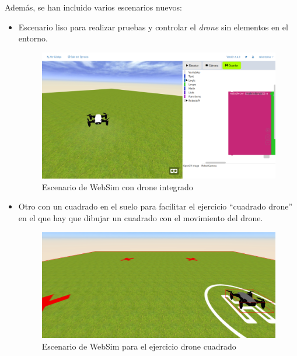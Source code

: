 Además, se han incluido varios escenarios nuevos:
\begin{itemize}
    \item Escenario liso para realizar pruebas y controlar el \textit{drone} sin elementos en el entorno. 
    
    \begin{figure}[H]
    \centering
    \includegraphics[scale=0.3]{img/websimDrone.png}
    \caption{Escenario de WebSim con drone integrado} \label{fig:escenarioDrone}
    \end{figure}
    
    \item Otro con un cuadrado en el suelo para facilitar el ejercicio ``cuadrado drone'' en el que hay que dibujar un cuadrado con el movimiento del drone.
    
    \begin{figure}[H]
        \centering
        \includegraphics[scale=0.4]{img/cuadradoDrone.png}
        \caption{Escenario de WebSim para el ejercicio drone cuadrado} 
        \label{fig:droneCuadrado}
    \end{figure}
    

\end{itemize}
